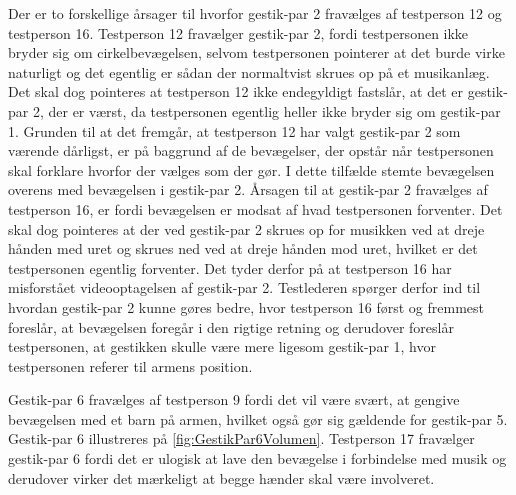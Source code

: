 Der er to forskellige årsager til hvorfor gestik-par 2 fravælges af testperson 12 og testperson 16. Testperson 12 fravælger gestik-par 2, fordi testpersonen ikke bryder sig om cirkelbevægelsen, selvom testpersonen pointerer at det burde virke naturligt og det egentlig er sådan der normaltvist skrues op på et musikanlæg. Det skal dog pointeres at testperson 12 ikke endegyldigt fastslår, at det er gestik-par 2, der er værst, da testpersonen egentlig heller ikke bryder sig om gestik-par 1. Grunden til at det fremgår, at testperson 12 har valgt gestik-par 2 som værende dårligst, er på baggrund af de bevægelser, der opstår når testpersonen skal forklare hvorfor der vælges som der gør. I dette tilfælde stemte bevægelsen overens med bevægelsen i gestik-par 2. Årsagen til at gestik-par 2 fravælges af testperson 16, er fordi bevægelsen er modsat af hvad testpersonen forventer. Det skal dog pointeres at der ved gestik-par 2 skrues op for musikken ved at dreje hånden med uret og skrues ned ved at dreje hånden mod uret, hvilket er det testpersonen egentlig forventer. Det tyder derfor på at testperson 16 har misforstået videooptagelsen af gestik-par 2. Testlederen spørger derfor ind til hvordan gestik-par 2 kunne gøres bedre, hvor testperson 16 først og fremmest foreslår, at bevægelsen foregår i den rigtige retning og derudover foreslår testpersonen, at gestikken skulle være mere ligesom gestik-par 1, hvor testpersonen referer til armens position. 

Gestik-par 6 fravælges af testperson 9 fordi det vil være svært, at gengive bevægelsen med et barn på armen, hvilket også gør sig gældende for gestik-par 5. Gestik-par 6 illustreres på \autoref{fig:GestikPar6Volumen}. Testperson 17 fravælger gestik-par 6 fordi det er ulogisk at lave den bevægelse i forbindelse med musik og derudover virker det mærkeligt at begge hænder skal være involveret. 


